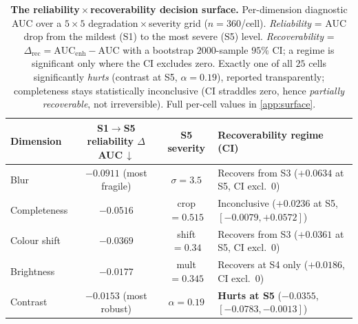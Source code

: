 \begin{table}[!tbp]
\centering
\caption{\textbf{The reliability\,$\times$\,recoverability decision surface.}
Per-dimension diagnostic AUC over a $5\times5$ degradation\,$\times$\,severity grid
($n=360$/cell). \emph{Reliability} = AUC drop from the mildest (S1) to the most severe
(S5) level. \emph{Recoverability} = $\Delta_{\text{rec}}=\mathrm{AUC}_{\text{enh}}-\mathrm{AUC}$
with a bootstrap $2000$-sample $95\%$ CI; a regime is significant only where the CI
excludes zero. Exactly one of all $25$ cells significantly \emph{hurts} (contrast at S5,
$\alpha{=}0.19$), reported transparently; completeness stays statistically inconclusive
(CI straddles zero, hence \emph{partially recoverable}, not irreversible). Full per-cell
values in \cref{app:surface}.}
\label{tab:c0-surface}
\vspace{4pt}
\footnotesize
\setlength{\tabcolsep}{5pt}
\renewcommand{\arraystretch}{1.05}
\begin{tabular}{lccl}
\toprule
Dimension & S1$\to$S5 reliability $\Delta$AUC\,$\downarrow$ & S5 severity & Recoverability regime (CI) \\
\midrule
Blur          & $-0.0911$ (most fragile) & $\sigma{=}3.5$       & Recovers from S3 ($+0.0634$ at S5, CI excl.\ 0) \\
Completeness  & $-0.0516$                & crop$=0.515$        & Inconclusive ($+0.0236$ at S5, $[-0.0079,+0.0572]$) \\
Colour shift  & $-0.0369$                & shift$=0.34$        & Recovers from S3 ($+0.0361$ at S5, CI excl.\ 0) \\
Brightness    & $-0.0177$                & mult$=0.345$        & Recovers at S4 only ($+0.0186$, CI excl.\ 0) \\
Contrast      & $\mathbf{-0.0153}$ (most robust) & $\alpha{=}0.19$ & \textbf{Hurts at S5} ($-0.0355$, $[-0.0783,-0.0013]$) \\
\bottomrule
\end{tabular}
\vspace{-4pt}
\end{table}

